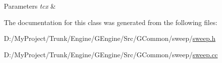\begin{DoxyParams}{Parameters}
{\em tcx} & \\
\hline
\end{DoxyParams}


The documentation for this class was generated from the following files\+:\begin{DoxyCompactItemize}
\item 
D\+:/\+My\+Project/\+Trunk/\+Engine/\+G\+Engine/\+Src/\+G\+Common/sweep/\hyperlink{sweep_8h}{sweep.\+h}\item 
D\+:/\+My\+Project/\+Trunk/\+Engine/\+G\+Engine/\+Src/\+G\+Common/sweep/\hyperlink{sweep_8cc}{sweep.\+cc}\end{DoxyCompactItemize}

